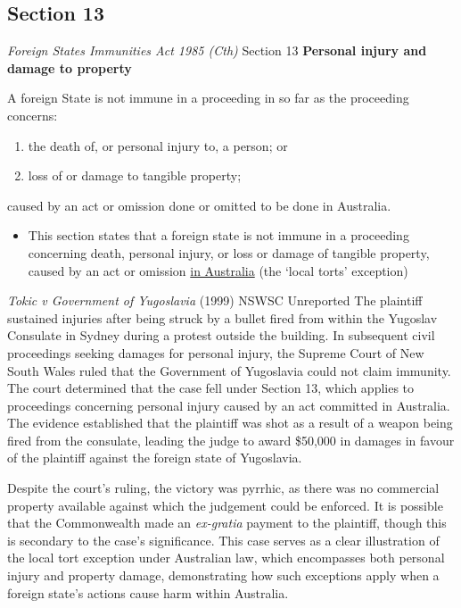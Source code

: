 \subsection{Section 13}
\begin{statutedetails}{\textit{Foreign States Immunities Act 1985 (Cth)} Section 13}
    \flushleft
    \textbf{Personal injury and damage to property}

    \vspace{\baselineskip}

    A foreign State is not immune in a proceeding in so far as the proceeding concerns:
    \begin{enumerate}[label=(\alph*)]
        \item the death of, or personal injury to, a person; or
        \item loss of or damage to tangible property;
    \end{enumerate}
    caused by an act or omission done or omitted to be done in Australia.
\end{statutedetails}

\begin{itemize}
    \item This section states that a foreign state is not immune in a proceeding concerning death, personal injury, or loss or damage of tangible property, caused by an act or omission \underline{in Australia} (the `local torts' exception)
\end{itemize}

\begin{casedetails}{\textit{Tokic v Government of Yugoslavia} (1999) NSWSC Unreported}
    \flushleft
    The plaintiff sustained injuries after being struck by a bullet fired from within the Yugoslav Consulate in Sydney during a protest outside the building. In subsequent civil proceedings seeking damages for personal injury, the Supreme Court of New South Wales ruled that the Government of Yugoslavia could not claim immunity. The court determined that the case fell under Section 13, which applies to proceedings concerning personal injury caused by an act committed in Australia. The evidence established that the plaintiff was shot as a result of a weapon being fired from the consulate, leading the judge to award \$50,000 in damages in favour of the plaintiff against the foreign state of Yugoslavia.

    \vspace{\baselineskip}
    
    Despite the court's ruling, the victory was pyrrhic, as there was no commercial property available against which the judgement could be enforced. It is possible that the Commonwealth made an \textit{ex-gratia} payment to the plaintiff, though this is secondary to the case's significance. This case serves as a clear illustration of the local tort exception under Australian law, which encompasses both personal injury and property damage, demonstrating how such exceptions apply when a foreign state's actions cause harm within Australia.
\end{casedetails}

